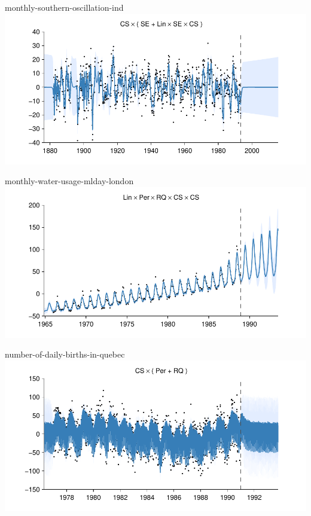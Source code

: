 \begin{frame}{monthly-southern-oscillation-ind}
  \center
  \includegraphics[width=1.0\textwidth]{figures/monthly-southern-oscillation-ind/monthly-southern-oscillation-ind_all}
\end{frame}
    
\begin{frame}{monthly-water-usage-mlday-london}
  \center
  \includegraphics[width=1.0\textwidth]{figures/monthly-water-usage-mlday-london/monthly-water-usage-mlday-london_all}
\end{frame}  


    
\begin{frame}{number-of-daily-births-in-quebec}
  \center
  \includegraphics[width=1.0\textwidth]{figures/number-of-daily-births-in-quebec/number-of-daily-births-in-quebec_all}
\end{frame}  
    
